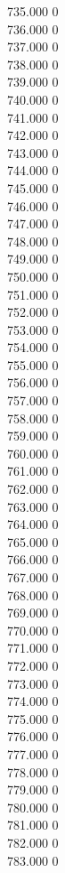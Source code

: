 { 735.000	0 \\
 736.000	0 \\
 737.000	0 \\
 738.000	0 \\
 739.000	0 \\
 740.000	0 \\
 741.000	0 \\
 742.000	0 \\
 743.000	0 \\
 744.000	0 \\
 745.000	0 \\
 746.000	0 \\
 747.000	0 \\
 748.000	0 \\
 749.000	0 \\
 750.000	0 \\
 751.000	0 \\
 752.000	0 \\
 753.000	0 \\
 754.000	0 \\
 755.000	0 \\
 756.000	0 \\
 757.000	0 \\
 758.000	0 \\
 759.000	0 \\
 760.000	0 \\
 761.000	0 \\
 762.000	0 \\
 763.000	0 \\
 764.000	0 \\
 765.000	0 \\
 766.000	0 \\
 767.000	0 \\
 768.000	0 \\
 769.000	0 \\
 770.000	0 \\
 771.000	0 \\
 772.000	0 \\
 773.000	0 \\
 774.000	0 \\
 775.000	0 \\
 776.000	0 \\
 777.000	0 \\
 778.000	0 \\
 779.000	0 \\
 780.000	0 \\
 781.000	0 \\
 782.000	0 \\
 783.000	0 \\
}
